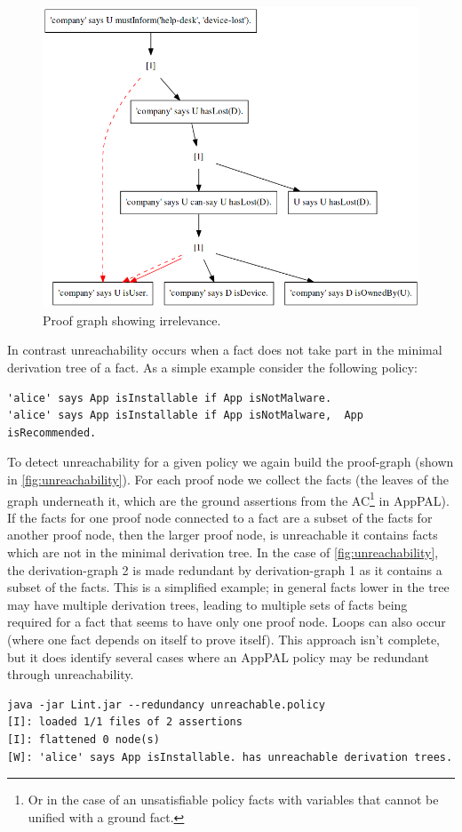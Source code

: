 \documentclass[a4paper]{scrartcl}
\begin{document}
\begin{figure}
  \centering
  \includegraphics[width=0.5\linewidth]{./figures/irrelevance.png}
  \caption{Proof graph showing irrelevance.}
  \label{fig:irrelevance}
\end{figure}

In contrast unreachability occurs when a fact does not take part in the minimal
derivation tree of a fact.  As a simple example consider the following policy:

\begin{lstlisting}
'alice' says App isInstallable if App isNotMalware.
'alice' says App isInstallable if App isNotMalware,  App isRecommended.
\end{lstlisting}

To detect unreachability for a given policy we again build the proof-graph (shown
in \autoref{fig:unreachability}).  For each proof node we collect the facts
(the leaves of the graph underneath it, which are the ground assertions from the
AC\footnote{Or in the case of an unsatisfiable policy facts with variables that
  cannot be unified with a ground fact.} in
AppPAL).  If the facts for one proof node connected to a fact are a subset of
the facts for another proof node, then the larger proof node, is unreachable it
contains facts which are not in the minimal derivation tree.   In the case of
\autoref{fig:unreachability}, the derivation-graph 2 is made redundant by
derivation-graph 1 as it contains a subset of the facts.  This is a
simplified example; in general facts lower in the tree may have multiple
derivation trees, leading to multiple sets of facts being required for a fact
that seems to have only one proof node.  Loops can also occur (where one fact
depends on itself to prove itself).  This approach isn't complete, but it does
identify several cases where an AppPAL policy may be redundant through
unreachability.

\begin{lstlisting}[float, caption={Output of AppPAL when checking a policy with unreachability.}]
java -jar Lint.jar --redundancy unreachable.policy
[I]: loaded 1/1 files of 2 assertions
[I]: flattened 0 node(s)
[W]: 'alice' says App isInstallable. has unreachable derivation trees.
\end{lstlisting}
\end{document}
